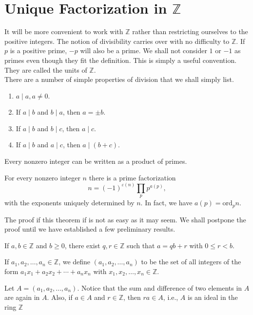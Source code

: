 \documentclass{mynotes}
\begin{document}
\section{Unique Factorization in $\mathbb{Z}$}
It will be more convenient to work with $\mathbb{Z}$ rather than restricting ourselves to the positive integers. The notion of divisibility carries over with no difficulty to $\mathbb{Z}$. If $p$ is a positive prime, $-p$ will also be a prime. We shall not consider $1$ or $-1$ as primes even though they fit the definition. This is simply a useful convention. They are called the units of $\mathbb{Z}$.\\There are a number of simple properties of division that we shall simply list.
\begin{enumerate}
\item $a\mid a,a\neq0$.
\item If $a\mid b$ and $b\mid a$, then $a=\pm b$.
\item If $a\mid b$ and $b\mid c$, then $a\mid c$.
\item If $a\mid b$ and $a\mid c$, then $a\mid (b+c)$.
\end{enumerate}
\begin{lemma}
Every nonzero integer can be written as a product of primes.
\end{lemma}
\begin{theorem}
For every nonzero integer $n$ there is a prime factorization$$n=(-1)^{\varepsilon(n)}\prod_pp^{a(p)},$$with the exponents uniquely determined by $n$. In fact, we have $a(p)=\mbox{ord}_pn$.
\end{theorem}
The proof if this theorem if is not as easy as it may seem. We shall postpone the proof until we have established a few preliminary results.
\begin{lemma}
If $a,b\in\mathbb{Z}$ and $b\ge0$, there exist $q,r\in\mathbb{Z}$ such that $a=qb+r$ with $0\leq r<b$.
\end{lemma}
\begin{definition}
If $a_1,a_2,\ldots,a_n\in\mathbb{Z}$, we define $(a_1,a_2,\ldots,a_n)$ to be the set of all integers of the form $a_1x_1+a_2x_2+\cdots+a_nx_n$ with $x_1,x_2,\ldots,x_n\in\mathbb{Z}$.
\end{definition}
\begin{remark}
Let $A = (a_1,a_2,\ldots,a_n)$. Notice that the sum and difference of two elements in $A$ are again in $A$. Also, if $a\in A$ and $r\in\mathbb{Z}$, then $ra\in A$, i.e., $A$ is an ideal in the ring $\mathbb{Z}$
\end{remark}
\end{document}
